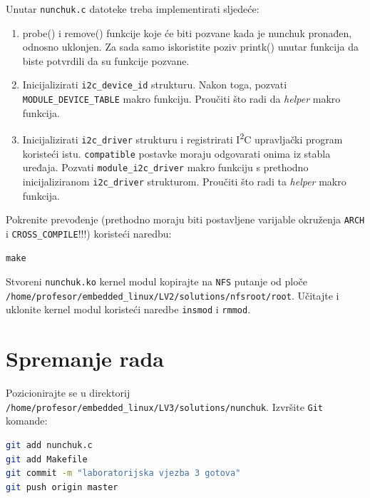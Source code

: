\documentclass[11pt]{article}
\begin{document}
Unutar \texttt{nunchuk.c} datoteke treba implementirati sljedeće:
\begin{enumerate}
	\item probe() i remove() funkcije koje će biti pozvane kada je nunchuk
pronađen, odnosno uklonjen. Za sada samo iskoristite poziv printk() unutar
funkcija da biste potvrdili da su funkcije pozvane.
	\item Inicijalizirati \texttt{i2c\_device\_id} strukturu. Nakon toga,
		pozvati \texttt{MODULE\_DEVICE\_TABLE} makro funkciju. Proučiti
		što radi da \textit{helper} makro funkcija.
	\item Inicijalizirati \texttt{i2c\_driver} strukturu i registrirati
		I\textsuperscript{2}C upravljački program koristeći istu.
		\texttt{compatible} postavke moraju odgovarati onima iz stabla
		uređaja. Pozvati \texttt{module\_i2c\_driver} makro funkciju s
		prethodno inicijaliziranom \texttt{i2c\_driver} strukturom.
		Proučiti što radi ta \textit{helper} makro funkcija.
\end{enumerate}

Pokrenite prevođenje (prethodno moraju biti postavljene varijable okruženja
\texttt{ARCH} i \texttt{CROSS\_COMPILE}!!!) koristeći naredbu:
\begin{lstlisting}
make
\end{lstlisting}

\noindent Stvoreni \texttt{nunchuk.ko} kernel modul kopirajte na \texttt{NFS} putanje
od ploče \texttt{/home/profesor/embedded\_linux/LV2/solutions/nfsroot/root}.
Učitajte i uklonite kernel modul koristeći naredbe \texttt{insmod} i \texttt{rmmod}.

\section{Spremanje rada}
Pozicionirajte se u direktorij \texttt{/home/profesor/embedded\_linux/LV3/solutions/nunchuk}.
Izvršite \texttt{Git} komande:
\begin{lstlisting}[language=bash]
git add nunchuk.c
git add Makefile
git commit -m "laboratorijska vjezba 3 gotova"
git push origin master
\end{lstlisting}
\end{document}
